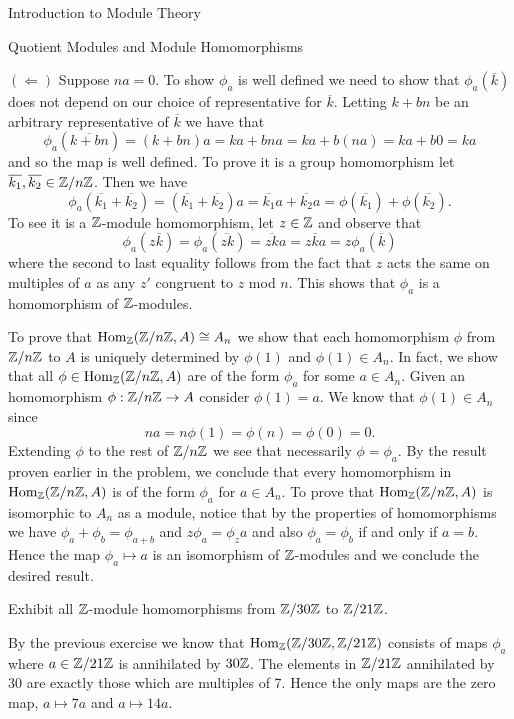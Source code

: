 \begin{chapter}{Introduction to Module Theory}
\begin{section}{Quotient Modules and Module Homomorphisms}
\begin{solution}
$(\Leftarrow)$ Suppose $na=0$. To show $\phi_a$ is well defined we need to show that $\phi_a(\overline{k})$ does not depend on our choice of representative for $\overline{k}$. Letting $k+bn$ be an arbitrary representative of $\overline{k}$ we have that \[
\phi_a(\overline{k+bn}) = (k+bn)a = ka + bna = ka  + b(na) = ka+b0 = ka 
\]
and so the map is well defined. To prove it is a group homomorphism let $\overline{k_1},\overline{k_2}\in \mathbb{Z}/n\mathbb{Z}$. Then we have \[
\phi_a(\overline{k_1}+\overline{k_2}) = (\overline{k_1}+\overline{k_2})a = \overline{k_1}a+\overline{k_2}a = \phi(\overline{k_1})+\phi(\overline{k_2}).
\]
To see it is a $\mathbb{Z}$-module homomorphism, let $z\in \mathbb{Z}$ and observe that \[
\phi_a(z\overline{k}) = \phi_a(\overline{zk}) = \overline{zk}a = z\overline{k}a = z\phi_a(\overline{k})
\]
where the second to last equality follows from the fact that $z$ acts the same on multiples of $a$ as any $z'$ congruent to $z$ mod $n$. This shows that $\phi_a$ is a homomorphism of $\mathbb{Z}$-modules. 

To prove that $\operatorname{Hom}_{\mathbb{Z}}(\mathbb{Z}/n\mathbb{Z}, A) \cong A_n$ we show that each homomorphism $\phi$ from $\mathbb{Z}/n\mathbb{Z}$ to $A$ is uniquely determined by $\phi(1)$ and $\phi(1)\in A_n$. In fact, we show that all $\phi\in \operatorname{Hom}_{\mathbb{Z}}(\mathbb{Z}/n\mathbb{Z}, A)$ are of the form $\phi_a$ for some $a\in A_n$. Given an homomorphism $\phi:\mathbb{Z}/n\mathbb{Z}\to A$ consider $\phi(1) = a$. We know that $\phi(1)\in A_n$ since \[
na = n\phi(1) = \phi(n) = \phi(0) = 0.
\]
Extending $\phi$ to the rest of $\mathbb{Z}/n\mathbb{Z}$ we see that necessarily $\phi = \phi_a$. By the result proven earlier in the problem, we conclude that every homomorphism in $\operatorname{Hom}_{\mathbb{Z}}(\mathbb{Z}/n\mathbb{Z},A)$ is of the form $\phi_a$ for $a\in A_n$. To prove that $\operatorname{Hom}_{\mathbb{Z}}(\mathbb{Z}/n\mathbb{Z},A)$ is isomorphic to $A_n$ as a module, notice that by the properties of homomorphisms we have $\phi_a+\phi_b = \phi_{a+b}$ and $z\phi_a = \phi_za$ and also $\phi_a = \phi_b$ if and only if $a=b$. Hence the map $\phi_a\mapsto a$ is an isomorphism of $\mathbb{Z}$-modules and we conclude the desired result.
\end{solution}\oneperpage



\begin{problem}\label{ex:10.2.5}
Exhibit all $\mathbb{Z}$-module homomorphisms from $\mathbb{Z}/30\mathbb{Z}$ to $\mathbb{Z}/21\mathbb{Z}$. 
\end{problem}
\begin{solution}
By the previous exercise we know that $\operatorname{Hom}_{\mathbb{Z}}(\mathbb{Z}/30\mathbb{Z},\mathbb{Z}/21\mathbb{Z})$ consists of maps $\phi_a$ where $a\in \mathbb{Z}/21\mathbb{Z}$ is annihilated by $30\mathbb{Z}$. The elements in $\mathbb{Z}/21\mathbb{Z}$ annihilated by 30 are exactly those which are multiples of 7. Hence the only maps are the zero map, $a\mapsto 7a$ and $a\mapsto 14a$. 
\end{solution}\oneperpage




\end{section}
\end{chapter}

